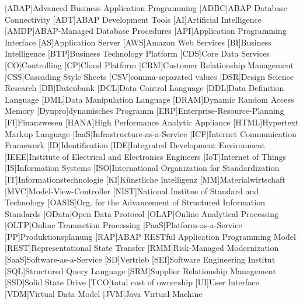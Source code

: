 

	\begin{acronym}[XXXXXXX]
		{Advanced Business Application Programming}
		{ABAP Database Connectivity}
		[ADT]{ABAP Development Tools}
		[AI]{Artificial Intelligence}
		{ABAP-Managed Database Procedures}
		[API]{Application Programming Interface}
		[AS]{Application Server}
		[AWS]{Amazon Web Services}
		[BI]{Business Intelligence}
		[BTP]{Business Technology Platform}
		[CDS]{Core Data Services}
		[CO]{Controlling}
		[CP]{Cloud Platform}
		[CRM]{Customer Relationship Management}
		[CSS]{Cascading Style Sheets}
		[CSV]{comma-separated values}
		[DSR]{Design Science Research}
		[DB]{Datenbank}
		[DCL]{Data Control Language}
		[DDL]{Data Definition Language}
		[DML]{Data Manipulation Language}
		{Dynamic Random Access Memory}
		[Dynpro]{dynamisches Programm}
		[ERP]{Enterprise-Resource-Planning}
		[FI]{Finanzwesen}
		{High Performance Analytic Appliance}
		{Hypertext Markup Language}
		{Infrastructure-as-a-Service}
		[ICF]{Internet Communication Framework}
		[ID]{Identification}
		[IDE]{Integrated Development Environment}
		{Institute of Electrical and Electronics Engineers}
		[IoT]{Internet of Things}
		[IS]{Information Systems}
		[ISO]{International Organization for Standardization}
		[IT]{Informationstechnologie}
		[KI]{Künstliche Intelligenz}
		[MM]{Materialwirtschaft}
		[MVC]{Model-View-Controller}
		{National Institue of Standard and Technology}
		[OASIS]{Org. for the Advancement of Structured Information Standards}
		[OData]{Open Data Protocol}
		{Online Analytical Processing}
		{Online Transaction Processing}
		{Platform-as-a-Service}
		[PP]{Produktionsplanung}
		[RAP]{ABAP RESTful Application Programming Model}
		{Representational State Transfer}
		[RMM]{Risk-Managed Modernization}
		{Software-as-a-Service}
		[SD]{Vertrieb}
		[SEI]{Software Engineering Institut}
		[SQL]{Structured Query Language}
		[SRM]{Supplier Relationship Management}
		[SSD]{Solid State Drive}
		[TCO]{total cost of ownership}
		[UI]{User Interface}
		[VDM]{Virtual Data Model}
		[JVM]{Java Virtual Machine}


\end{acronym}
